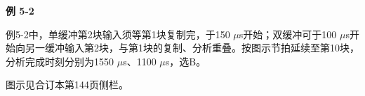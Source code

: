 {\color{ink}\bfseries 例 5-2}\par\vspace{1bp}例5-2中，单缓冲第2块输入须等第1块复制完，于150 \(\mu \)s开始；双缓冲可于100 \(\mu \)s开始向另一缓冲输入第2块，与第1块的复制、分析重叠。按图示节拍延续至第10块，分析完成时刻分别为1550 \(\mu \)s、1100 \(\mu \)s，选B。\par {\color{ink}图示见合订本第144页侧栏。}
